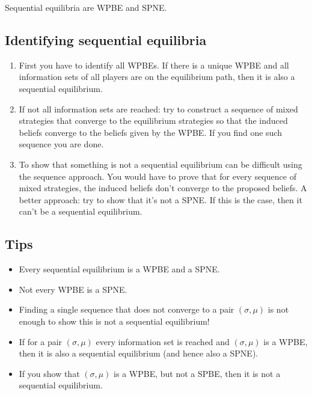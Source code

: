 \documentclass[letter, 11pt]{article}
\theoremstyle{basic}
\begin{document}
\begin{spacing}{1.0}
Sequential equilibria are WPBE and SPNE.

\subsection{Identifying sequential equilibria}

\begin{enumerate}
\item First you have to identify all WPBEs. If there is a unique WPBE and
  all information sets of all players are on the equilibrium path, then it
  is also a sequential equilibrium.
\item If not all information sets are reached: try to construct a sequence
  of mixed strategies that converge to the equilibrium strategies so that
  the induced beliefs converge to the beliefs given by the WPBE. If you
  find one such sequence you are done.
\item To show that something is not a sequential equilibrium can be
  difficult using the sequence approach. You would have to prove that for
  every sequence of mixed strategies, the induced beliefs don't converge to
  the proposed beliefs. A better approach: try to show that it's not a
  SPNE. If this is the case, then it can't be a sequential equilibrium.
\end{enumerate}

\subsection{Tips}

\begin{itemize}
\item Every sequential equilibrium is a WPBE and a SPNE.
\item Not every WPBE is a SPNE.
\item Finding a single sequence that does not converge to a pair $(\sigma,
  \mu)$ is not enough to show this is not a sequential equilibrium!
\item If for a pair $(\sigma, \mu)$ every information set is reached and
  $(\sigma, \mu)$ is a WPBE, then it is also a sequential equilibrium (and
  hence also a SPNE).
\item If you show that $(\sigma, \mu)$ is a WPBE, but not a SPBE, then it
  is not a sequential equilibrium.
\end{itemize}

\end{spacing}
\end{document}
